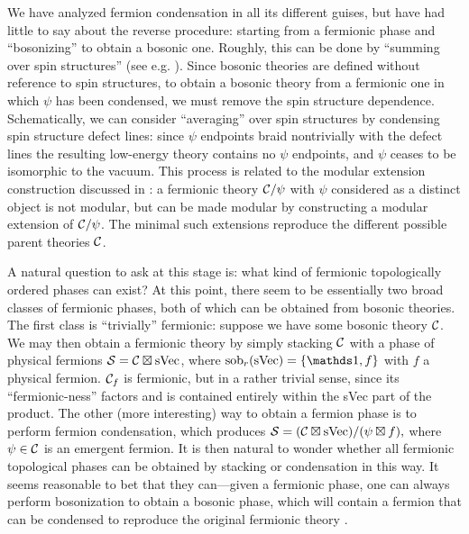 We have analyzed fermion condensation in all its different guises, but have had little to say about the reverse procedure:
starting from a fermionic phase and ``bosonizing'' to obtain a bosonic one. Roughly, this can be done by 
``summing over spin structures'' (see e.g. \cite{bhardwaj2016, kapustin2017}).
Since bosonic theories are defined without reference to spin structures, to obtain a bosonic theory from a fermionic 
one in which $\psi$ has been condensed, we must remove the spin structure dependence. 
Schematically, we can consider ``averaging'' over spin structures by condensing spin structure defect lines: since $\psi$ endpoints braid nontrivially with the defect lines the resulting low-energy theory contains no 
$\psi$ endpoints, and $\psi$ ceases to be isomorphic to the vacuum. 
This process is related to the modular extension construction discussed in \cite{Lan2016b}: a fermionic theory $\mathcal{C} /\psi$ with $\psi$ considered as a distinct object is not modular, but can be made modular by
constructing a modular extension of $\mathcal{C} / \psi$. The minimal such extensions reproduce the different possible 
parent theories $\mathcal{C}$. 

A natural question to ask at this stage is: what kind of fermionic topologically ordered phases can exist? 
At this point, there seem to be essentially two broad classes of fermionic phases, both of which can be obtained from bosonic theories. 
The first class is ``trivially'' fermionic: suppose we have some bosonic theory $\mathcal{C}$. 
We may then obtain a fermionic theory by simply stacking $\mathcal{C}$ with a phase of physical fermions $\mathcal{S} = \mathcal{C} \boxtimes {\rm sVec}$, where $\sob({\rm sVec}) = \{\unit,f\}$ with $f$ a physical fermion. 
$\mathcal{C}_f$ is fermionic, but in a rather trivial sense, since its ``fermionic-ness'' factors and is contained entirely within the sVec part of the product. 
The other (more interesting) way to obtain a fermion phase is to perform fermion condensation, 
which produces $\mathcal{S} = (\mathcal{C} \boxtimes {\rm sVec}) / (\psi \boxtimes f),$
where $\psi \in \mathcal{C}$ is an emergent fermion. 
It is then natural to wonder whether all fermionic topological phases can be obtained by stacking or condensation in this way. 
It seems reasonable to bet that they can---given a fermionic phase, one can always perform bosonization 
to obtain a bosonic phase, which will contain a fermion that can be condensed to reproduce the 
original fermionic theory \cite{bhardwaj2016, kapustin2017,usher2016}. 


